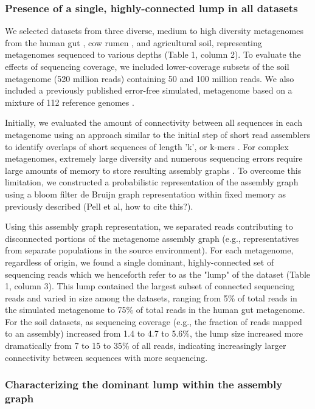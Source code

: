 \documentclass[10pt]{article}
\begin{document}
\subsubsection*{Presence of a single, highly-connected lump in all datasets}
We selected datasets from three diverse, medium to high diversity metagenomes from the human gut \cite{Qin:2010p189}, cow rumen \cite{Hess:2011p686}, and agricultural soil, representing metagenomes sequenced to various depths (Table 1, column 2).  To evaluate the effects of sequencing coverage, we included lower-coverage subsets of the soil metagenome (520 million reads) containing 50 and 100 million reads.  We also included a previously published error-free simulated, metagenome based on a mixture of 112 reference genomes \cite{Pignatelli:2011p742}.

Initially, we evaluated the amount of connectivity between all sequences in each metagenome using an approach similar to the initial step of short read assemblers to identify overlaps of short sequences of length 'k', or k-mers \cite{Peng:2011p898,Simpson:2009p233,Zerbino:2008p665}.  For complex metagenomes, extremely large diversity and numerous sequencing errors require large amounts of memory to store resulting assembly graphs \cite{Hess:2011p686,Mackelprang:2011p1087,Qin:2010p189}.  To overcome this limitation, we constructed a probabilistic representation of the assembly graph using a bloom filter de Bruijn graph representation within fixed memory as previously described (Pell et al, how to cite this?).  

Using this assembly graph representation, we separated reads contributing to disconnected portions of the metagenome assembly graph (e.g., representatives from separate populations in the source environment).  For each metagenome, regardless of origin, we found a single dominant, highly-connected set of sequencing reads which we henceforth refer to as the  "lump"  of the dataset (Table 1, column 3).  This lump contained the largest subset of connected sequencing reads and varied in size among the datasets, ranging from 5\% of total reads in the simulated metagenome to 75\% of total reads in the human gut metagenome.  For the soil datasets, as sequencing coverage (e.g., the fraction of reads mapped to an assembly) increased from 1.4 to 4.7 to 5.6\%, the lump size increased more dramatically from 7 to 15 to 35\% of all reads, indicating increasingly larger connectivity between sequences with more sequencing.

\subsubsection*{Characterizing the dominant lump within the assembly graph}
\end{document}
